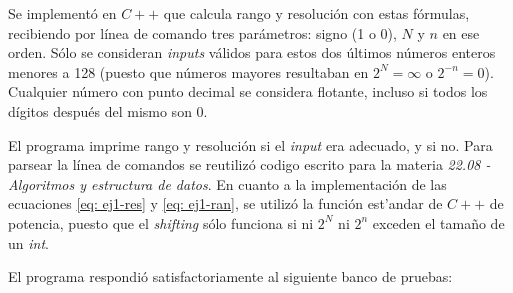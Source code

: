 \documentclass[../../../informe/src/main.tex]{subfiles}
\begin{document}
Se implement\'o en $C++$ que calcula rango y resoluci\'on con estas f\'ormulas, recibiendo por l\'inea de comando tres par\'ametros: signo (1 o 0), $N$ y $n$ en ese orden. S\'olo se consideran \textit{inputs} v\'alidos para estos dos \'ultimos n\'umeros enteros menores a 128 (puesto que n\'umeros mayores resultaban en $2^N = \infty$ o $2^{-n}=0$). Cualquier n\'umero con punto decimal se considera flotante, incluso si todos los d\'igitos despu\'es del mismo son 0.\par

El programa imprime rango y resoluci\'on si el \textit{input} era adecuado, y  si no. Para parsear la l\'inea de comandos se reutiliz\'o codigo escrito para la materia \textit{22.08 - Algoritmos y estructura de datos}. En cuanto a la implementaci\'on de las ecuaciones \ref{eq: ej1-res} y \ref{eq: ej1-ran}, se utiliz\'o la funci\'on est'andar de $C++$ de potencia, puesto que el \textit{shifting} s\'olo funciona si ni $2^N$  ni $2^n$ exceden el tama\~no de un \textit{int}.\par

El programa respondi\'o satisfactoriamente al siguiente banco de pruebas:


  
\end{document}
